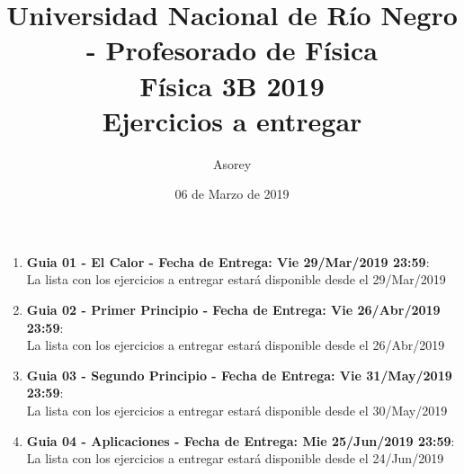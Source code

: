 \documentclass[a4paper,12pt]{article}
\begin{document}
\title{
{\normalsize{Universidad Nacional de Río Negro - Profesorado de Física}}\\
Física 3B 2019\\ Ejercicios a entregar}
\author{Asorey}
\date{06 de Marzo de 2019}
\maketitle

\begin{enumerate}
	\item {\bf{Guia 01 - El Calor - Fecha de Entrega: Vie 29/Mar/2019 23:59}}:\\
		La lista con los ejercicios a entregar estará disponible desde el 29/Mar/2019
	\item {\bf{Guia 02 - Primer Principio - Fecha de Entrega: Vie 26/Abr/2019 23:59}}:\\		
		La lista con los ejercicios a entregar estará disponible desde el 26/Abr/2019
	\item {\bf{Guia 03 - Segundo Principio - Fecha de Entrega: Vie 31/May/2019 23:59}}:\\		
		La lista con los ejercicios a entregar estará disponible desde el 30/May/2019
	\item {\bf{Guia 04 - Aplicaciones - Fecha de Entrega: Mie 25/Jun/2019 23:59}}:\\		
		La lista con los ejercicios a entregar estará disponible desde el 24/Jun/2019
\end{enumerate}
\end{document}
